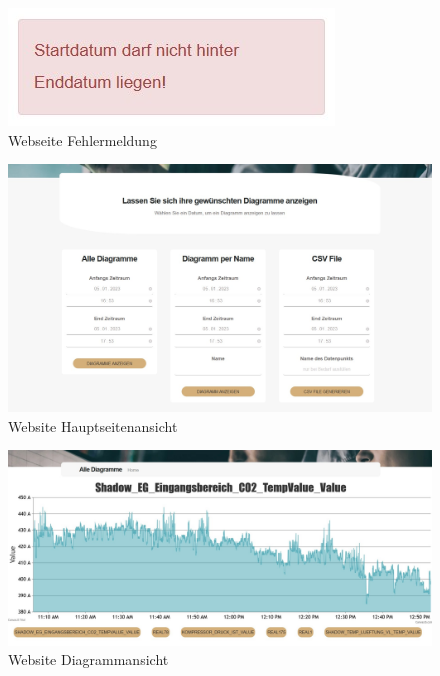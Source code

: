\begin{figure}
    \centering
    \includegraphics[scale=1]{pics/FlexLoggerWebsite_Fehlermeldung.jpg}
    \caption{Webseite Fehlermeldung}
    \label{fig:impl:FlexLoggerHauptseitenAnsichtFehlermeldung}
\end{figure}


\begin{figure}
    \centering
    \includegraphics[scale=0.45]{pics/FlexLoggerWebsiteFormulare.jpg}
    \caption{Website Hauptseitenansicht}
    \label{fig:impl:FlexLoggerHauptseitenAnsicht}
\end{figure}

\begin{figure}
    \centering
    \includegraphics[scale=0.35]{pics/FlexLoggerWebsiteDiagramm.jpg}
    \caption{Website Diagrammansicht}
    \label{fig:impl:FlexLoggerDiagrammAnsicht}
\end{figure}

